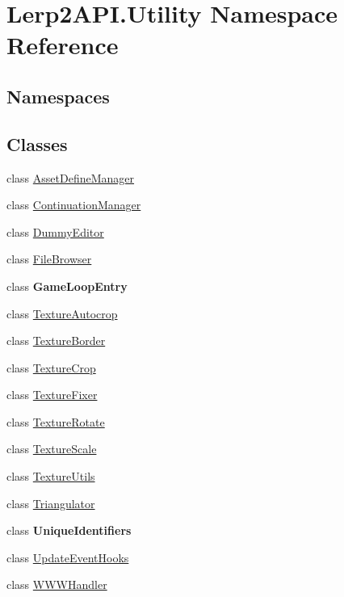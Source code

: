 \hypertarget{namespace_lerp2_a_p_i_1_1_utility}{}\section{Lerp2\+A\+P\+I.\+Utility Namespace Reference}
\label{namespace_lerp2_a_p_i_1_1_utility}
\subsection*{Namespaces}
\begin{DoxyCompactItemize}
\end{DoxyCompactItemize}
\subsection*{Classes}
\begin{DoxyCompactItemize}
\item 
class \hyperlink{class_lerp2_a_p_i_1_1_utility_1_1_asset_define_manager}{Asset\+Define\+Manager}
\item 
class \hyperlink{class_lerp2_a_p_i_1_1_utility_1_1_continuation_manager}{Continuation\+Manager}
\item 
class \hyperlink{class_lerp2_a_p_i_1_1_utility_1_1_dummy_editor}{Dummy\+Editor}
\item 
class \hyperlink{class_lerp2_a_p_i_1_1_utility_1_1_file_browser}{File\+Browser}
\item 
class {\bfseries Game\+Loop\+Entry}
\item 
class \hyperlink{class_lerp2_a_p_i_1_1_utility_1_1_texture_autocrop}{Texture\+Autocrop}
\item 
class \hyperlink{class_lerp2_a_p_i_1_1_utility_1_1_texture_border}{Texture\+Border}
\item 
class \hyperlink{class_lerp2_a_p_i_1_1_utility_1_1_texture_crop}{Texture\+Crop}
\item 
class \hyperlink{class_lerp2_a_p_i_1_1_utility_1_1_texture_fixer}{Texture\+Fixer}
\item 
class \hyperlink{class_lerp2_a_p_i_1_1_utility_1_1_texture_rotate}{Texture\+Rotate}
\item 
class \hyperlink{class_lerp2_a_p_i_1_1_utility_1_1_texture_scale}{Texture\+Scale}
\item 
class \hyperlink{class_lerp2_a_p_i_1_1_utility_1_1_texture_utils}{Texture\+Utils}
\item 
class \hyperlink{class_lerp2_a_p_i_1_1_utility_1_1_triangulator}{Triangulator}
\item 
class {\bfseries Unique\+Identifiers}
\item 
class \hyperlink{class_lerp2_a_p_i_1_1_utility_1_1_update_event_hooks}{Update\+Event\+Hooks}
\item 
class \hyperlink{class_lerp2_a_p_i_1_1_utility_1_1_w_w_w_handler}{W\+W\+W\+Handler}
\end{DoxyCompactItemize}
